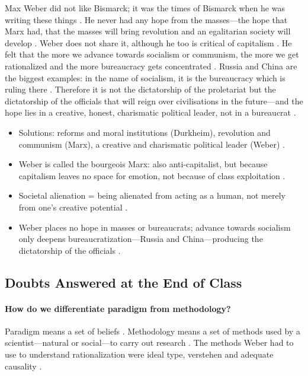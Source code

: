 \begin{CriticalPoint}
Max Weber did not like Bismarck; it was the times of Bismarck when he was writing these things .
He never had any hope from the masses---the hope that Marx had, that the masses will bring revolution and an egalitarian society will develop . Weber does not share it, although he too is critical of capitalism .
He felt that the more we advance towards socialism or communism, the more we get rationalized and the more bureaucracy gets concentrated . Russia and China are the biggest examples: in the name of socialism, it is the bureaucracy which is ruling there .
Therefore it is not the dictatorship of the proletariat but the dictatorship of the officials that will reign over civilisations in the future---and the hope lies in a creative, honest, charismatic political leader, not in a bureaucrat .
\end{CriticalPoint}

\begin{QuickRevision}
\begin{itemize}
    \item Solutions: reforms and moral institutions (Durkheim), revolution and communism (Marx), a creative and charismatic political leader (Weber) .
    \item Weber is called the bourgeois Marx: also anti-capitalist, but because capitalism leaves no space for emotion, not because of class exploitation .
    \item Societal alienation = being alienated from acting as a human, not merely from one's creative potential .
    \item Weber places no hope in masses or bureaucrats; advance towards socialism only deepens bureaucratization---Russia and China---producing the dictatorship of the officials .
\end{itemize}
\end{QuickRevision}

\subsection{Doubts Answered at the End of Class}
\paragraph{How do we differentiate paradigm from methodology?}
Paradigm means a set of beliefs . Methodology means a set of methods used by a scientist---natural or social---to carry out research . The methods Weber had to use to understand rationalization were ideal type, verstehen and adequate causality .

